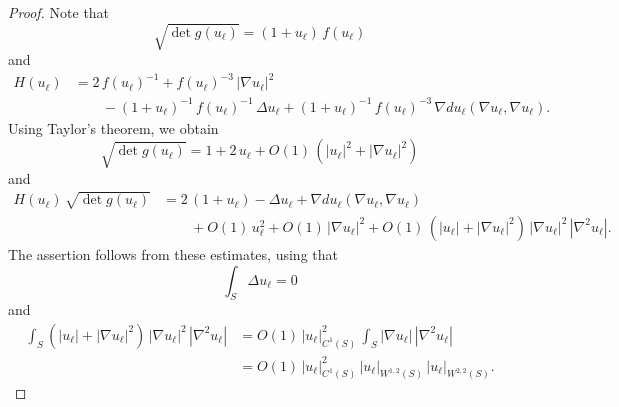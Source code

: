 \documentclass[11pt]{amsart}
\theoremstyle {definition}
\begin{document}
\begin{proof}
	Note that
	$$
	\sqrt{\det g(u_\ell)}=(1+u_\ell)\,f(u_\ell)
	$$
	and
	\begin{align*} 
	H(u_\ell)&=2\,f(u_\ell)^{-1}+f(u_\ell)^{-3}\,|\nabla u_\ell|^2\\&\qquad -(1+u_\ell)^{-1}\,f(u_\ell)^{-1}\,\Delta u_\ell  +(1+u_\ell)^{-1}\,f(u_\ell)^{-3}\,\nabla du_\ell(\nabla u_\ell,\nabla u_\ell ).
	\end{align*} 
Using Taylor's theorem, we obtain
$$
\sqrt{\det g(u_\ell)}=1+2\,u_\ell+O(1)\,(|u_\ell|^2+|\nabla u_\ell|^2)
$$
and
\begin{align*} 
H(u_\ell)\,\sqrt{\det g(u_\ell)}
&=2\,(1+u_\ell)-\Delta u_\ell+\nabla d u_\ell(\nabla u_\ell,\nabla u_\ell)\\&\qquad+O(1)\,u_\ell^2 +O(1)\,|\nabla u_\ell|^2+O(1)\,(|u_\ell|+|\nabla u_\ell|^2)\,|\nabla u_\ell|^2\,|\nabla^2 u_\ell|.
\end{align*}
The assertion follows from these estimates, using that 
$$
\int_S \Delta u_\ell=0
$$
and 
\begin{align*} 
\int_S  (|u_\ell|+|\nabla u_\ell|^2)\,|\nabla u_\ell|^2\,|\nabla^2 u_\ell|&=O(1)\, |u_\ell|^2_{C^1(S)}\,\int_S  |\nabla u_\ell|\,|\nabla^2 u_\ell|
\\&=O(1)\, |u_\ell|^2_{C^1(S)}\,|u_\ell|_{W^{1,2}(S)}\,|u_\ell|_{W^{2,2}(S)}.
\end{align*} 
\end{proof}
\end{document}
